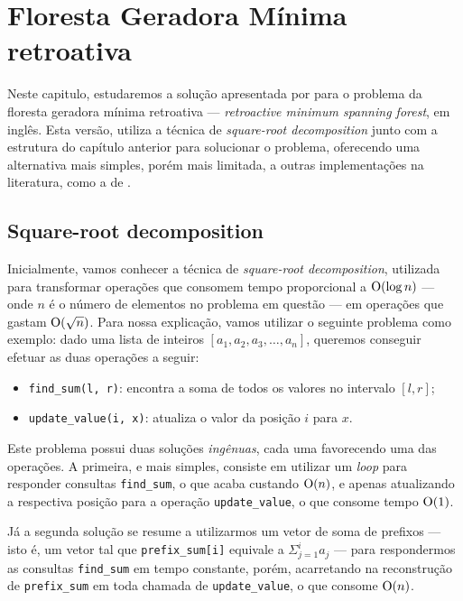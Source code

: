 
\chapter{Floresta Geradora Mínima retroativa}
\label{cap:retroactive-msf}

Neste capitulo, estudaremos a solução apresentada por \citet{10.1093/comjnl/bxaa135} para o problema da floresta geradora mínima retroativa --- \emph{retroactive minimum spanning forest}, em inglês. Esta versão, utiliza a técnica de \emph{square-root decomposition} junto com a estrutura do capítulo anterior para solucionar o problema, oferecendo uma alternativa mais simples, porém mais limitada, a outras implementações na literatura, como a de \citet{10.1145/502090.502095}.

\section{Square-root decomposition}
\label{sec:sqrt-decomp}

Inicialmente, vamos conhecer a técnica de \emph{square-root decomposition}, utilizada para transformar operações que consomem tempo proporcional a $\mathrm{O}(\log n)$ --- onde $n$ é o número de elementos no problema em questão --- em operações que gastam $\mathrm{O}(\sqrt{n})$. Para nossa explicação, vamos utilizar o seguinte problema como exemplo: dado uma lista de inteiros $ [ a_1, a_2, a_3, \dots, a_n ] $, queremos conseguir efetuar as duas operações a seguir:

\begin{itemize}
    \item \texttt{find\_sum(l, r)}: encontra a soma de todos os valores no intervalo $[l,r]$;
    \item \texttt{update\_value(i, x)}: atualiza o valor da posição $i$ para $x$.
\end{itemize}

Este problema possui duas soluções \emph{ingênuas}, cada uma favorecendo uma das operações. A primeira, e mais simples, consiste em utilizar um \emph{loop} para responder consultas \texttt{find\_sum}, o que acaba custando $\mathrm{O}(n)$, e apenas atualizando a respectiva posição para a operação \texttt{update\_value}, o que consome tempo $\mathrm{O}(1)$.

Já a segunda solução se resume a utilizarmos um vetor de soma de prefixos --- isto é, um vetor tal que \texttt{prefix\_sum[i]} equivale a $\Sigma_{j=1}^{i} a_j$ --- para respondermos as consultas \texttt{find\_sum} em tempo constante, porém, acarretando na reconstrução de \texttt{prefix\_sum} em toda chamada de \texttt{update\_value}, o que consome $\mathrm{O}(n)$.

